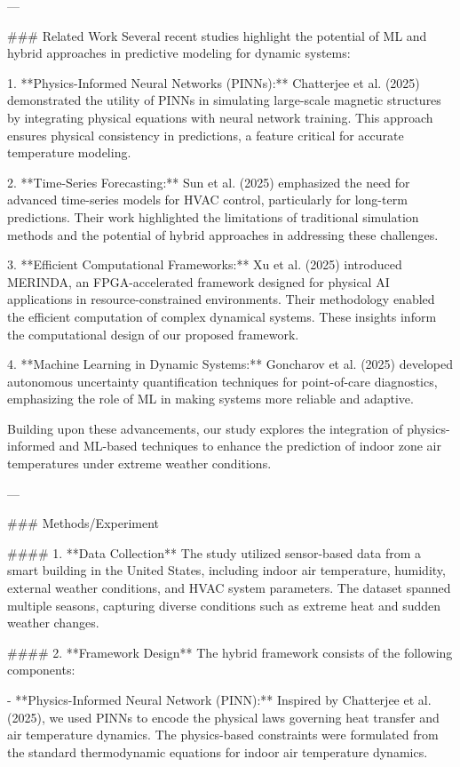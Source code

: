 ---

### Related Work  
Several recent studies highlight the potential of ML and hybrid approaches in predictive modeling for dynamic systems:

1. **Physics-Informed Neural Networks (PINNs):** Chatterjee et al. (2025) demonstrated the utility of PINNs in simulating large-scale magnetic structures by integrating physical equations with neural network training. This approach ensures physical consistency in predictions, a feature critical for accurate temperature modeling.

2. **Time-Series Forecasting:** Sun et al. (2025) emphasized the need for advanced time-series models for HVAC control, particularly for long-term predictions. Their work highlighted the limitations of traditional simulation methods and the potential of hybrid approaches in addressing these challenges.

3. **Efficient Computational Frameworks:** Xu et al. (2025) introduced MERINDA, an FPGA-accelerated framework designed for physical AI applications in resource-constrained environments. Their methodology enabled the efficient computation of complex dynamical systems. These insights inform the computational design of our proposed framework.

4. **Machine Learning in Dynamic Systems:** Goncharov et al. (2025) developed autonomous uncertainty quantification techniques for point-of-care diagnostics, emphasizing the role of ML in making systems more reliable and adaptive.

Building upon these advancements, our study explores the integration of physics-informed and ML-based techniques to enhance the prediction of indoor zone air temperatures under extreme weather conditions.

---

### Methods/Experiment  

#### 1. **Data Collection**  
The study utilized sensor-based data from a smart building in the United States, including indoor air temperature, humidity, external weather conditions, and HVAC system parameters. The dataset spanned multiple seasons, capturing diverse conditions such as extreme heat and sudden weather changes.

#### 2. **Framework Design**  
The hybrid framework consists of the following components:

- **Physics-Informed Neural Network (PINN):** Inspired by Chatterjee et al. (2025), we used PINNs to encode the physical laws governing heat transfer and air temperature dynamics. The physics-based constraints were formulated from the standard thermodynamic equations for indoor air temperature dynamics.
  
